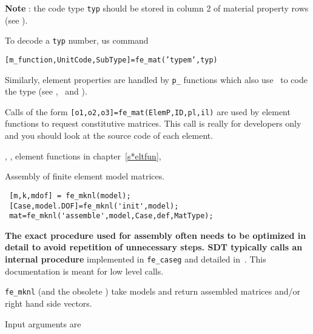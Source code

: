 {\bf Note} : the code type {\tt typ} should be stored in column 2 of material property rows (see ).

To decode a {\tt typ} number, us command

{\tt [m\_function,UnitCode,SubType]=fe\_mat('typem',typ)}

Similarly, element properties are handled by {\tt p\_} functions which also use \femat\ to code the type (see \pbeam, \pshell\ and \psolid).


Calls of the form {\tt [o1,o2,o3]=fe\_mat(ElemP,ID,pl,il)} are used by element functions to request constitutive matrices. This call is really for developers only and you should look at the source code of each element.



\noindent \melastic, \pshell, element functions in chapter~\ref{s*eltfun}, 


\noindent Assembly of finite element model matrices.

\rsyntax\begin{verbatim}
 [m,k,mdof] = fe_mknl(model);
 [Case,model.DOF]=fe_mknl('init',model); 
 mat=fe_mknl('assemble',model,Case,def,MatType);
\end{verbatim}


\begin{SDT}
 {\bf The exact procedure used for assembly often needs to be optimized in detail to avoid repetition of unnecessary steps. SDT typically calls an internal procedure} implemented in {\tt fe\_caseg}  and detailed in~. This documentation is meant for low level calls.
\end{SDT}


{\tt fe\_mknl} (and the obsolete \femk) take models and return assembled matrices and/or right hand side vectors. 

Input arguments are


